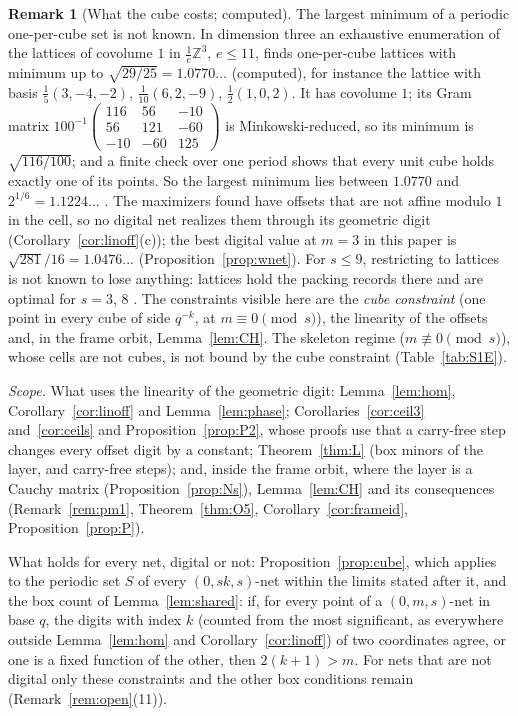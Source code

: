 \documentclass[11pt]{amsart}
\theoremstyle{definition}
\newtheorem{remark}[theorem]{Remark}
\theoremstyle{plain}
\newcommand{\Z}{\mathbb{Z}}
\begin{document}
\begin{remark}[What the cube costs; computed]\label{rem:cubecost}
The largest minimum of a periodic one-per-cube set is not known. In dimension three an exhaustive enumeration of the lattices of covolume $1$ in $\frac1e\Z^3$, $e\le11$, finds one-per-cube lattices with minimum up to $\sqrt{29/25}=1.0770\ldots$ (computed), for instance the lattice with basis $\tfrac1{5}(3,-4,-2)$, $\tfrac1{10}(6,2,-9)$, $\tfrac1{2}(1,0,2)$. It has covolume $1$; its Gram matrix $100^{-1}\left(\begin{smallmatrix}116&56&-10\\56&121&-60\\-10&-60&125\end{smallmatrix}\right)$ is Minkowski-reduced, so its minimum is $\sqrt{116/100}$; and a finite check over one period shows that every unit cube holds exactly one of its points. So the largest minimum lies between $1.0770$ and $2^{1/6}=1.1224\ldots$ \cite{Hal05}. The maximizers found have offsets that are not affine modulo $1$ in the cell, so no digital net realizes them through its geometric digit (Corollary~\ref{cor:linoff}(c)); the best digital value at $m=3$ in this paper is $\sqrt{281}/16=1.0476\ldots$ (Proposition~\ref{prop:wnet}). For $s\le9$, restricting to lattices is not known to lose anything: lattices hold the packing records there and are optimal for $s=3$, $8$ \cite{CS99,Hal05,Via17}. The constraints visible here are the \emph{cube constraint} (one point in every cube of side $q^{-k}$, at $m\equiv0\pmod s$), the linearity of the offsets and, in the frame orbit, Lemma~\ref{lem:CH}. The skeleton regime ($m\not\equiv0\pmod s$), whose cells are not cubes, is not bound by the cube constraint (Table~\ref{tab:S1E}).
\end{remark}

\emph{Scope.} What uses the linearity of the geometric digit: Lemma~\ref{lem:hom}, Corollary~\ref{cor:linoff} and Lemma~\ref{lem:phase}; Corollaries~\ref{cor:ceil3} and~\ref{cor:ceils} and Proposition~\ref{prop:P2}, whose proofs use that a carry-free step changes every offset digit by a constant; Theorem~\ref{thm:L} (box minors of the layer, and carry-free steps); and, inside the frame orbit, where the layer is a Cauchy matrix (Proposition~\ref{prop:Ns}), Lemma~\ref{lem:CH} and its consequences (Remark~\ref{rem:pm1}, Theorem~\ref{thm:O5}, Corollary~\ref{cor:frameid}, Proposition~\ref{prop:P}).

What holds for every net, digital or not: Proposition~\ref{prop:cube}, which applies to the periodic set $S$ of every $(0,sk,s)$-net within the limits stated after it, and the box count of Lemma~\ref{lem:shared}: if, for every point of a $(0,m,s)$-net in base $q$, the digits with index $k$ (counted from the most significant, as everywhere outside Lemma~\ref{lem:hom} and Corollary~\ref{cor:linoff}) of two coordinates agree, or one is a fixed function of the other, then $2(k+1)>m$. For nets that are not digital only these constraints and the other box conditions remain (Remark~\ref{rem:open}(11)).
\end{document}
